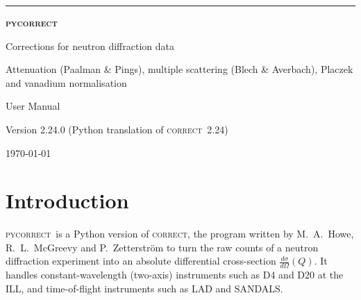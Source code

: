 \documentclass[11pt,a4paper]{report}
\newcommand{\pyc}{\textsc{pycorrect}}
\newcommand{\cor}{\textsc{correct}}
\newcommand{\dsig}{\frac{d\sigma}{d\Omega}}
\begin{document}
\begin{titlepage}
\thispagestyle{empty}
\vspace*{2.5cm}
{\color{accent}\rule{\linewidth}{2pt}}\par\vspace{0.6cm}
{\fontsize{44}{48}\selectfont\bfseries\pyc}\par\vspace{0.3cm}
{\LARGE Corrections for neutron diffraction data}\par\vspace{0.2cm}
{\Large\color{ink2} Attenuation (Paalman \& Pings), multiple scattering
(Blech \& Averbach), Placzek and vanadium normalisation}\par
\vspace{0.6cm}{\color{accent}\rule{\linewidth}{2pt}}\par
\vspace{1.5cm}
{\Large User Manual}\par\vspace{0.3cm}
{\large Version 2.24.0 \quad(Python translation of \cor\ 2.24)}\par
\vfill
{}
\vspace{1cm}
{\small\color{ink2}\today}
\end{titlepage}

\tableofcontents
\clearpage
{}

\chapter{Introduction}

\pyc\ is a Python version of \cor, the program written by
M.~A.~Howe, R.~L.~McGreevy and P.~Zetterstr\"om to turn the raw counts of a neutron
diffraction experiment into an absolute differential cross-section
$\dsig(Q)$. It handles constant-wavelength (two-axis) instruments such as
D4 and D20 at the ILL, and time-of-flight instruments such as LAD and SANDALS.
\end{document}
